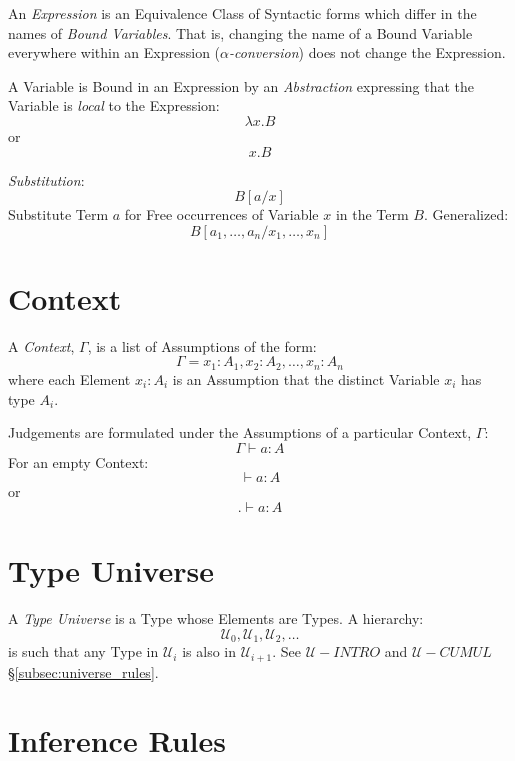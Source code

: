 An \emph{Expression} is an Equivalence Class of Syntactic forms which
differ in the names of \emph{Bound Variables}. That is, changing the
name of a Bound Variable everywhere within an Expression
(\emph{$\alpha$-conversion}) does not change the Expression.

A Variable is Bound in an Expression by an \emph{Abstraction}
expressing that the Variable is \emph{local} to the Expression:
\[
    \lambda x.B
\]
or
\[
    x.B
\]

\emph{Substitution}:
\[
    B[a/x]
\]
Substitute Term $a$ for Free occurrences of Variable $x$ in the Term
$B$. Generalized:
\[
    B[a_1,\ldots,a_n / x_1,\ldots,x_n]
\]



\section{Context}\label{sec:type_context}

A \emph{Context}, $\Gamma$, is a list of Assumptions of the form:
\[
    \Gamma = x_1 : A_1, x_2 : A_2, \ldots, x_n : A_n
\]
where each Element $x_i : A_i$ is an Assumption that the distinct
Variable $x_i$ has type $A_i$.

Judgements are formulated under the Assumptions of a particular
Context, $\Gamma$:
\[
    \Gamma \vdash a : A
\]
For an empty Context:
\[
    \vdash a : A
\]
or
\[
    . \vdash a : A
\]



\section{Type Universe}\label{sec:type_universe}

A \emph{Type Universe} is a Type whose Elements are Types. A hierarchy:
\[
    \mathcal{U}_0, \mathcal{U}_1, \mathcal{U}_2, \ldots
\]
is such that any Type in $\mathcal{U}_i$ is also in
$\mathcal{U}_{i+1}$. See $\mathcal{U}-INTRO$ and $\mathcal{U}-CUMUL$
\S\ref{subsec:universe_rules}.



\section{Inference Rules}\label{sec:type_inference}

